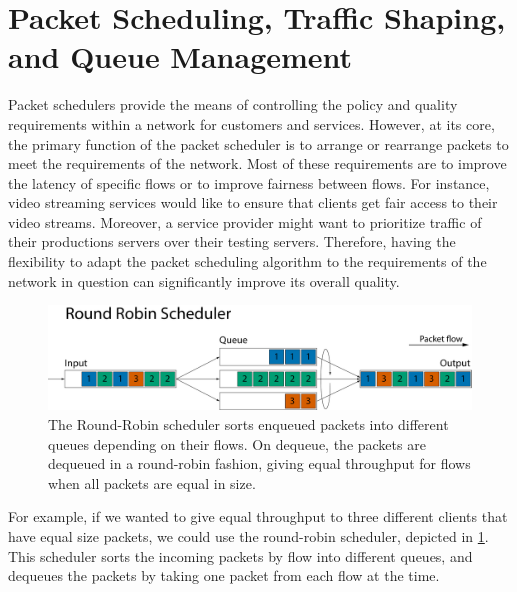 \documentclass[sigconf, nonacm]{acmart}
\begin{document}
\section{Packet Scheduling, Traffic Shaping, and Queue Management}

Packet schedulers provide the means of controlling the policy and quality requirements within a network for customers and services. However, at its core, the primary function of the packet scheduler is to arrange or rearrange packets to meet the requirements of the network. Most of these requirements are to improve the latency of specific flows or to improve fairness between flows. For instance, video streaming services would like to ensure that clients get fair access to their video streams. Moreover, a service provider might want to prioritize traffic of their productions servers over their testing servers. Therefore, having the flexibility to adapt the packet scheduling algorithm to the requirements of the network in question can significantly improve its overall quality.

\begin{figure}
  \includegraphics[width=\linewidth]{round-robin.pdf}
  \caption{The Round-Robin scheduler sorts enqueued packets into different queues depending on their flows. On dequeue, the packets are dequeued in a round-robin fashion, giving equal throughput for flows when all packets are equal in size.}
  \label{fig:round_robin}
\end{figure}

For example, if we wanted to give equal throughput to three different clients that have equal size packets, we could use the round-robin scheduler\cite{nagle1987packet}, depicted in \cref{fig:round_robin}. This scheduler sorts the incoming packets by flow into different queues, and dequeues the packets by taking one packet from each flow at the time.

\end{document}
